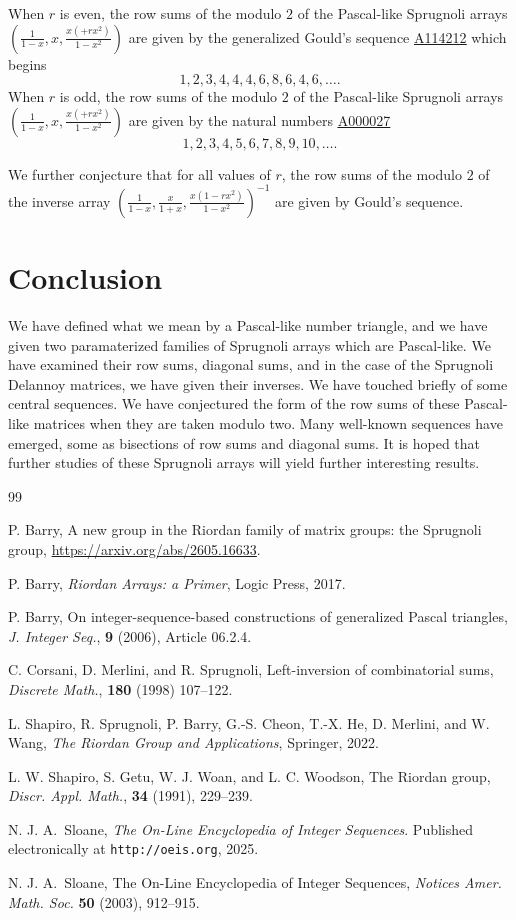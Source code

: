 \documentclass[12pt,reqno]{article}
\theoremstyle{definition}
\newcommand{\seqnum}[1]{\href{http://oeis.org/#1}{\underline{#1}}}
\begin{document}
When $r$ is even,  the row sums of the modulo $2$ of the Pascal-like Sprugnoli arrays $\left(\frac{1}{1-x},x, \frac{x(+rx^2)}{1-x^2}\right)$ are given by the generalized Gould's sequence \seqnum{A114212} which begins
$$1, 2, 3, 4, 4, 4, 6, 8, 6, 4, 6,\ldots.$$
When $r$ is odd, the row sums of the modulo $2$ of the Pascal-like Sprugnoli arrays $\left(\frac{1}{1-x},x, \frac{x(+rx^2)}{1-x^2}\right)$ are given by the natural numbers \seqnum{A000027}
$$1,2,3,4,5,6,7,8,9,10,\ldots.$$

We further conjecture that for all values of $r$, the row sums of the modulo $2$ of the inverse array $\left(\frac{1}{1-x}, \frac{x}{1+x}, \frac{x(1-rx^2)}{1-x^2}\right)^{-1}$ are given by Gould's sequence.

\section{Conclusion} We have defined what we mean by a Pascal-like number triangle, and we have given two paramaterized families of Sprugnoli arrays which are Pascal-like. We have examined their row sums, diagonal sums, and in the case of the Sprugnoli Delannoy matrices, we have given their inverses. We have touched briefly of some central sequences. We have conjectured the form of the row sums of these Pascal-like matrices when they are taken modulo two. Many well-known sequences have emerged, some as bisections of row sums and diagonal sums. It is hoped that further studies of these Sprugnoli arrays will yield further interesting results.

\begin{thebibliography}{99}

 P. Barry, A new group in the Riordan family of matrix
groups: the Sprugnoli group, \url{https://arxiv.org/abs/2605.16633}.

 P. Barry, \emph{Riordan Arrays: a Primer}, Logic Press, 2017.

 P. Barry, On integer-sequence-based constructions of generalized Pascal triangles, \emph{J.
Integer Seq.}, \textbf{9} (2006), Article 06.2.4.

 C. Corsani, D. Merlini, and R. Sprugnoli, Left-inversion of combinatorial sums, \emph{Discrete Math.}, \textbf{180} (1998) 107--122.

 L. Shapiro, R. Sprugnoli, P. Barry, G.-S. Cheon, T.-X. He, D. Merlini, and W. Wang, \emph{The Riordan Group and Applications}, Springer, 2022.

 L. W. Shapiro, S. Getu, W. J. Woan, and L. C. Woodson, The Riordan group, \emph{Discr. Appl. Math.}, \textbf{34} (1991),
 229--239.

 N. J. A.~Sloane, \emph{The On-Line Encyclopedia of Integer Sequences}. Published electronically at \texttt{http://oeis.org}, 2025.

 N. J. A.~Sloane, The On-Line Encyclopedia of Integer Sequences, \emph{Notices Amer. Math. Soc.} \textbf{50} (2003),  912--915.




\end{thebibliography}
\end{document}

